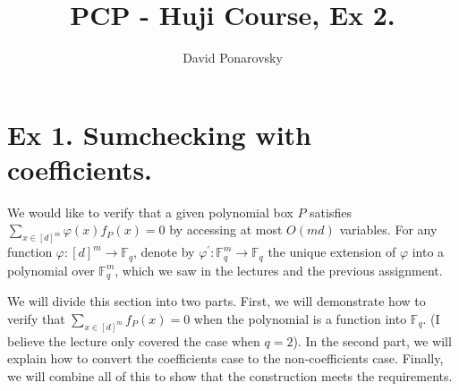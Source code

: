 \documentclass{article}
\title{PCP - Huji Course, Ex 2.}
\author{David Ponarovsky}
\newcommand{\FF}{\mathbb{F}_{q}}
\begin{document}
\maketitle

\section{Ex 1. Sumchecking with coefficients.}

%
We would like to verify that a given polynomial box $P$ satisfies $\sum_{x\in [d]^{m}}{ \varphi\left( x \right) f_{P}\left( x \right) } = 0$ by accessing at most $O\left(md\right)$ variables. For any function $\varphi : [d]^{m} \rightarrow \FF$, denote by $\varphi^{\prime} : \FF^{m} \rightarrow \FF$ the unique extension of $\varphi$ into a polynomial over $\FF^{m}$, which we saw in the lectures and the previous assignment.



%
We will divide this section into two parts. First, we will demonstrate how to verify that $\sum_{x \in [d]^{m}}{ f_{P}\left( x \right) } = 0$ when the polynomial is a function into $\FF$. (I believe the lecture only covered the case when $q = 2$). In the second part, we will explain how to convert the coefficients case to the non-coefficients case. Finally, we will combine all of this to show that the construction meets the requirements.

\end{document}

